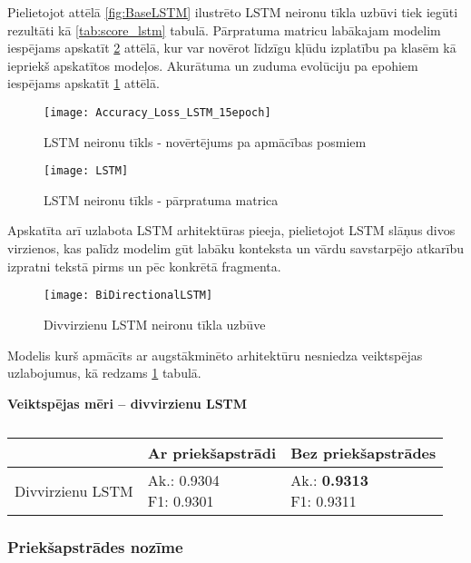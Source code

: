 Pielietojot attēlā \ref{fig:BaseLSTM} ilustrēto LSTM neironu tīkla uzbūvi tiek iegūti rezultāti kā \ref{tab:score_lstm} tabulā. Pārpratuma matricu labākajam modelim iespējams apskatīt \ref{fig:LSTM} attēlā, kur var novērot līdzīgu kļūdu izplatību pa klasēm kā iepriekš apskatītos modeļos. Akurātuma un zuduma evolūciju pa epohiem iespējams apskatīt \ref{fig:Accuracy_Loss_LSTM_15epoch} attēlā.

\begin{figure}[H]
\texttt{[image: Accuracy\_Loss\_LSTM\_15epoch]}
\caption{LSTM neironu tīkls - novērtējums pa apmācības posmiem}
\label{fig:Accuracy_Loss_LSTM_15epoch}
\end{figure}

\begin{figure}[H]
\centering
\texttt{[image: LSTM]}
\caption{LSTM neironu tīkls - pārpratuma matrica}
\label{fig:LSTM}
\end{figure}

Apskatīta arī uzlabota LSTM arhitektūras pieeja, pielietojot LSTM slāņus divos virzienos, kas palīdz modelim gūt labāku konteksta un vārdu savstarpējo atkarību izpratni tekstā pirms un pēc konkrētā fragmenta.

\begin{figure}[H]
\centering
\texttt{[image: BiDirectionalLSTM]}
\caption{Divvirzienu LSTM neironu tīkla uzbūve}
\label{fig:BiDirectionalLSTM}
\end{figure}

Modelis kurš apmācīts ar augstākminēto arhitektūru nesniedza veiktspējas uzlabojumus, kā redzams \ref{tab:score_bilstm} tabulā.

\begin{table}[H]
\centering
\caption{\label{tab:score_bilstm}}
\textbf{Veiktspējas mēri – divvirzienu LSTM\\}
\begin{tabular}{|l|l|l|}
\hline
& Ar priekšapstrādi & Bez priekšapstrādes \\ \hline
Divvirzienu LSTM & \makecell{Ak.: 0.9304  \\ F1: 0.9301} & \makecell{Ak.: \textbf{0.9313}  \\ F1: 0.9311}\\ \hline 
\end{tabular}
\end{table}

\subsubsection{Priekšapstrādes nozīme}

